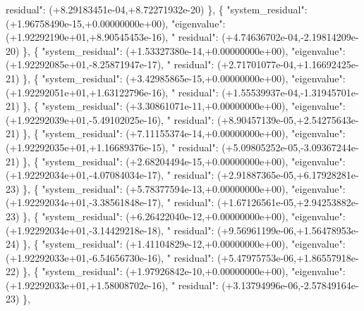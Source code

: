 \begin{DoxyCode}
{      residual"}: (+8.29183451e-04,+8.72271932e-20) \},
\{ \textcolor{stringliteral}{"system\_residual"}: (+1.96758490e-15,+0.00000000e+00), \textcolor{stringliteral}{"eigenvalue"}: (+1.92292190e+01,+8.90545453e-16), \textcolor{stringliteral}{"
      residual"}: (+4.74636702e-04,-2.19814209e-20) \},
\{ \textcolor{stringliteral}{"system\_residual"}: (+1.53327380e-14,+0.00000000e+00), \textcolor{stringliteral}{"eigenvalue"}: (+1.92292085e+01,-8.25871947e-17), \textcolor{stringliteral}{"
      residual"}: (+2.71701077e-04,+1.16692425e-21) \},
\{ \textcolor{stringliteral}{"system\_residual"}: (+3.42985865e-15,+0.00000000e+00), \textcolor{stringliteral}{"eigenvalue"}: (+1.92292051e+01,+1.63122796e-16), \textcolor{stringliteral}{"
      residual"}: (+1.55539937e-04,-1.31945701e-21) \},
\{ \textcolor{stringliteral}{"system\_residual"}: (+3.30861071e-11,+0.00000000e+00), \textcolor{stringliteral}{"eigenvalue"}: (+1.92292039e+01,-5.49102025e-16), \textcolor{stringliteral}{"
      residual"}: (+8.90457139e-05,+2.54275643e-21) \},
\{ \textcolor{stringliteral}{"system\_residual"}: (+7.11155374e-14,+0.00000000e+00), \textcolor{stringliteral}{"eigenvalue"}: (+1.92292035e+01,+1.16689376e-15), \textcolor{stringliteral}{"
      residual"}: (+5.09805252e-05,-3.09367244e-21) \},
\{ \textcolor{stringliteral}{"system\_residual"}: (+2.68204494e-15,+0.00000000e+00), \textcolor{stringliteral}{"eigenvalue"}: (+1.92292034e+01,-4.07084034e-17), \textcolor{stringliteral}{"
      residual"}: (+2.91887365e-05,+6.17928281e-23) \},
\{ \textcolor{stringliteral}{"system\_residual"}: (+5.78377594e-13,+0.00000000e+00), \textcolor{stringliteral}{"eigenvalue"}: (+1.92292034e+01,-3.38561848e-17), \textcolor{stringliteral}{"
      residual"}: (+1.67126561e-05,+2.94253882e-23) \},
\{ \textcolor{stringliteral}{"system\_residual"}: (+6.26422040e-12,+0.00000000e+00), \textcolor{stringliteral}{"eigenvalue"}: (+1.92292034e+01,-3.14429218e-18), \textcolor{stringliteral}{"
      residual"}: (+9.56961199e-06,+1.56478953e-24) \},
\{ \textcolor{stringliteral}{"system\_residual"}: (+1.41104829e-12,+0.00000000e+00), \textcolor{stringliteral}{"eigenvalue"}: (+1.92292033e+01,-6.54656730e-16), \textcolor{stringliteral}{"
      residual"}: (+5.47975753e-06,+1.86557918e-22) \},
\{ \textcolor{stringliteral}{"system\_residual"}: (+1.97926842e-10,+0.00000000e+00), \textcolor{stringliteral}{"eigenvalue"}: (+1.92292033e+01,+1.58008702e-16), \textcolor{stringliteral}{"
      residual"}: (+3.13794996e-06,-2.57849164e-23) \},
\end{DoxyCode}


